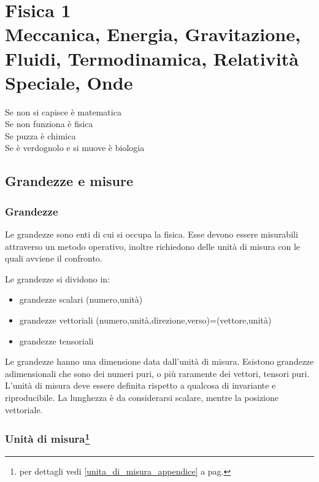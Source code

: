 \part[Fisica 1]{Fisica 1\\\vspace{1cm}\large{Meccanica, Energia, Gravitazione, Fluidi, Termodinamica, Relatività Speciale, Onde}}


\begin{savequote}
Se non si capisce è matematica\\
Se non funziona è fisica\\
Se puzza è chimica\\
Se è verdognolo e si muove è biologia\\
\end{savequote}
\chapter{Grandezze e misure}
\section{Grandezze}
Le grandezze sono enti di cui si occupa la fisica. Esse devono essere misurabili attraverso un metodo operativo, inoltre richiedono delle unità di misura con le quali avviene il confronto.
\newline\par
Le grandezze si dividono in:
\begin{itemize}
\item{}grandezze scalari (numero,unità)
\item{}grandezze vettoriali
(numero,unità,direzione,verso)=(vettore,unità)
\item{}grandezze tensoriali
\end{itemize}
Le grandezze hanno una dimensione data dall'unità di misura. Esistono grandezze adimensionali che sono dei numeri puri, o più raramente dei vettori, tensori puri. L'unità di misura deve essere definita rispetto a qualcosa di invariante e riproducibile. La lunghezza è da considerarsi scalare, mentre la posizione vettoriale.
\section[Unità di misura]{Unità di misura\protect\footnote{per dettagli vedi \ref{unita_di_misura_appendice} a pag.\@\pageref{unita_di_misura_appendice}}}
